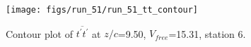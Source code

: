 \begin{figure}[H]
\centering
\texttt{[image: figs/run\_51/run\_51\_tt\_contour]}
\caption{Contour plot of $\overline{t^\prime t^\prime}$ at $z/c$=9.50, $V_{free}$=15.31, station 6.}
\label{fig:run_51_tt_contour}
\end{figure}


